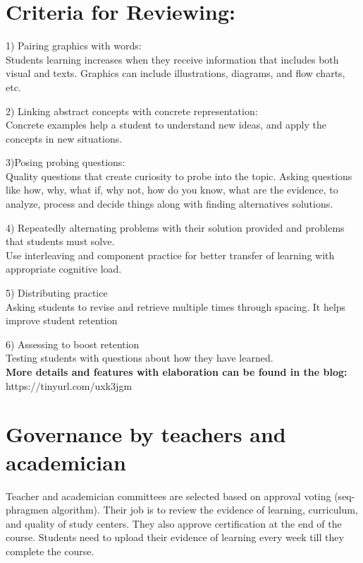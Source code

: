 \documentclass[a4paper,12pt,twoside]{extarticle}
\begin{document}
\begin{adjustwidth}{11em}{}
\section*{Criteria for Reviewing:}

1) Pairing graphics with words:\\
Students learning increases when they receive information that includes both visual and texts. Graphics can include illustrations, diagrams, and flow charts, etc.

2) Linking abstract concepts with concrete representation:\\
Concrete examples help a student to understand new ideas, and apply the concepts in new situations.

3)Posing probing questions: \\
Quality questions that create curiosity to probe into the topic.
Asking questions like how, why, what if, why not, how do you know, what are the evidence, to analyze, process and decide things along with finding alternatives solutions. 

4) Repeatedly alternating problems with their solution provided and problems that students must solve. \\
Use interleaving and component practice for better transfer of learning with appropriate cognitive load.

5) Distributing practice \\
Asking students to revise and retrieve multiple times through spacing. It helps improve student retention

6) Assessing to boost retention \\
Testing students with questions about how they have learned.
\\
\textbf{More details and features with elaboration can be found in the blog:} \\
https://tinyurl.com/uxk3jgm

\section*{Governance by teachers and academician}

Teacher and academician committees are selected based on approval voting (seq-phragmen algorithm). Their job is to review the evidence of learning, curriculum, and quality of study centers. They also approve certification at the end of the course. Students need to upload their evidence of learning every week till they complete the course. 


\end{adjustwidth}
\end{document}
